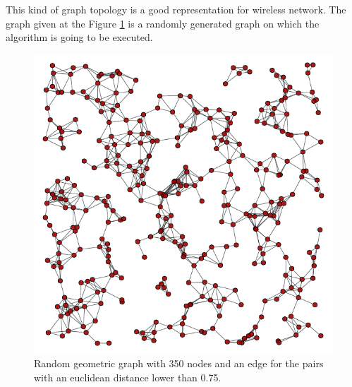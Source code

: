 \documentclass[letterpaper]{article}
\begin{document}
This kind of graph topology is a good representation for wireless network. The graph given at the Figure \ref{fig:GeoExample} is a randomly generated graph on which the algorithm is going to be executed.
\begin{figure}[h]
\centering
\includegraphics[scale=0.55]{./Figures/geometric.pdf}
\caption{Random geometric graph with 350 nodes and an edge for the pairs with an euclidean distance lower than 0.75.} \label{fig:GeoExample}
\end{figure}
\end{document}
